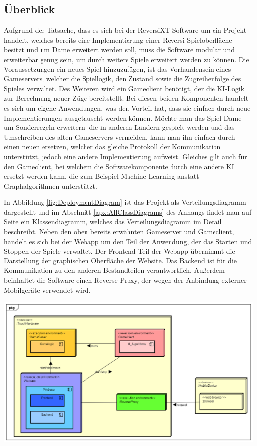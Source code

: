 \documentclass[12pt,a4paper,bibliography=totocnumbered,listof=totocnumbered]{article}
\begin{document}
\subsection{Überblick}
Aufgrund der Tatsache, dass es sich bei der \ac{ReversiXT} Software um ein Projekt handelt, welches bereits eine Implementierung einer Reversi Spieloberfläche besitzt und 
um Dame erweitert werden soll, muss die Software modular und erweiterbar genug sein, um durch weitere Spiele erweitert werden zu können.
Die Voraussetzungen ein neues Spiel hinzuzufügen, ist das Vorhandensein eines Gameservers, welcher die Spiellogik, 
den Zustand sowie die Zugreihenfolge des Spieles verwaltet. Des Weiteren wird ein Gameclient benötigt, der die \ac{KI}-Logik zur Berechnung
neuer Züge bereitstellt. Bei diesen beiden Komponenten handelt es sich um eigene Anwendungen, was den Vorteil hat, dass sie einfach 
durch neue Implementierungen ausgetauscht werden können. Möchte man das Spiel Dame um Sonderregeln erweitern, die in anderen Ländern gespielt werden
und das Umschreiben des alten Gameservers vermeiden, kann man ihn einfach durch einen neuen ersetzen, welcher das gleiche Protokoll der Kommunikation 
unterstützt, jedoch eine andere Implementierung aufweist. Gleiches gilt auch für den Gameclient, bei welchem die Softwarekomponente durch 
eine andere \ac{KI} ersetzt werden kann, die zum Beispiel Machine Learning anstatt Graphalgorithmen unterstützt. 

In Abbildung \ref{fig:DeploymentDiagram} ist das Projekt als Verteilungsdiagramm dargestellt und im Abschnitt \ref{apx:AllClassDiagrams} des Anhangs findet
man auf Seite \pageref{apx:AllClassDiagrams} ein Klassendiagramm, welches das Verteilungsdiagramm im Detail beschreibt. 
Neben den oben bereits erwähnten Gameserver und Gameclient, handelt es sich bei der Webapp um den Teil der Anwendung, der das Starten und Stoppen der Spiele verwaltet.
Der Frontend-Teil der Webapp übernimmt die Darstellung der graphischen Oberfläche der Website. Das Backend ist für die Kommunikation zu den anderen 
Bestandteilen verantwortlich. Außerdem beinhaltet die Software einen Reverse Proxy, der wegen der Anbindung externer Mobilgeräte verwendet wird.

\vspace{1em}
\begin{minipage}{\linewidth}
	\centering
	\includegraphics[width=1.0\linewidth]{pics/DeploymentDiagram.png}
	\label{fig:DeploymentDiagram}
\end{minipage}
\end{document}
